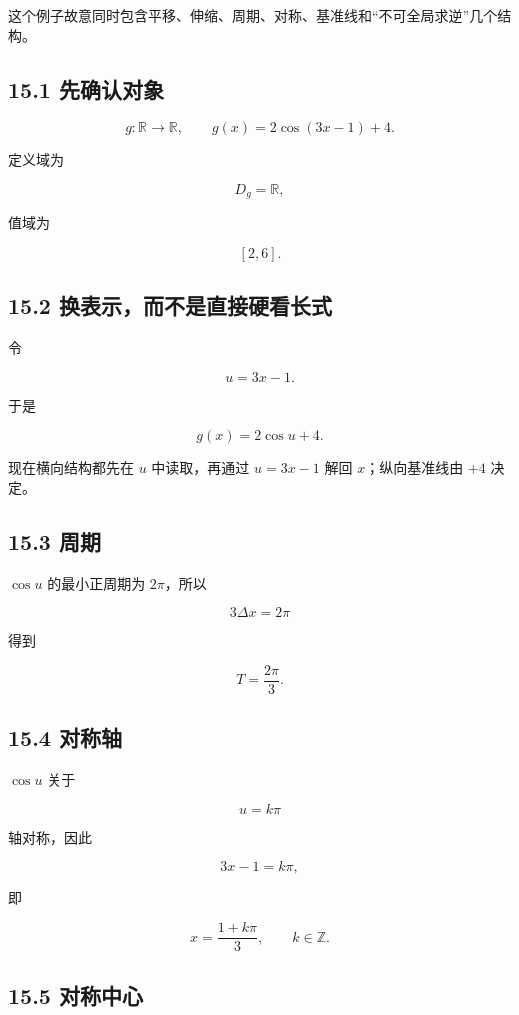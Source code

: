 \documentclass[11pt,a4paper]{ctexart}
\begin{document}
这个例子故意同时包含平移、伸缩、周期、对称、基准线和``不可全局求逆''几个结构。

\subsection{15.1 先确认对象}\label{ux5148ux786eux8ba4ux5bf9ux8c61}

\[
g:\mathbb R\to\mathbb R,
\qquad
g(x)=2\cos(3x-1)+4.
\]

定义域为

\[
D_g=\mathbb R,
\]

值域为

\[
[2,6].
\]

\subsection{15.2
换表示，而不是直接硬看长式}\label{ux6362ux8868ux793aux800cux4e0dux662fux76f4ux63a5ux786cux770bux957fux5f0f}

令

\[
u=3x-1.
\]

于是

\[
g(x)=2\cos u+4.
\]

现在横向结构都先在 \(u\) 中读取，再通过 \(u=3x-1\) 解回
\(x\)；纵向基准线由 \(+4\) 决定。

\subsection{15.3 周期}\label{ux5468ux671f-2}

\(\cos u\) 的最小正周期为 \(2\pi\)，所以

\[
3\Delta x=2\pi
\]

得到

\[
\boxed{T=\frac{2\pi}{3}}.
\]

\subsection{15.4 对称轴}\label{ux5bf9ux79f0ux8f74-1}

\(\cos u\) 关于

\[
u=k\pi
\]

轴对称，因此

\[
3x-1=k\pi,
\]

即

\[
\boxed{x=\frac{1+k\pi}{3}},\qquad k\in\mathbb Z.
\]

\subsection{15.5 对称中心}\label{ux5bf9ux79f0ux4e2dux5fc3-1}
\end{document}
